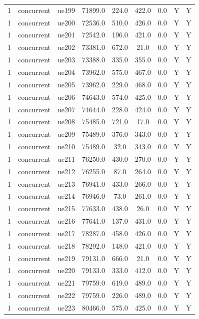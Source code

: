 \begin{table}[ht]
\begin{tabular}{|c|c|c|c|c|c|c|c|c|}
1 & concurrent & ue199 & 71899.0 & 224.0 & 422.0 & 0.0 & Y & Y \\
1 & concurrent & ue200 & 72536.0 & 510.0 & 426.0 & 0.0 & Y & Y \\
1 & concurrent & ue201 & 72542.0 & 196.0 & 421.0 & 0.0 & Y & Y \\
1 & concurrent & ue202 & 73381.0 & 672.0 & 21.0 & 0.0 & Y & Y \\
1 & concurrent & ue203 & 73388.0 & 335.0 & 355.0 & 0.0 & Y & Y \\
1 & concurrent & ue204 & 73962.0 & 575.0 & 467.0 & 0.0 & Y & Y \\
1 & concurrent & ue205 & 73962.0 & 229.0 & 468.0 & 0.0 & Y & Y \\
1 & concurrent & ue206 & 74643.0 & 574.0 & 425.0 & 0.0 & Y & Y \\
1 & concurrent & ue207 & 74644.0 & 228.0 & 424.0 & 0.0 & Y & Y \\
1 & concurrent & ue208 & 75485.0 & 721.0 & 17.0 & 0.0 & Y & Y \\
1 & concurrent & ue209 & 75489.0 & 376.0 & 343.0 & 0.0 & Y & Y \\
1 & concurrent & ue210 & 75489.0 & 32.0 & 343.0 & 0.0 & Y & Y \\
1 & concurrent & ue211 & 76250.0 & 430.0 & 270.0 & 0.0 & Y & Y \\
1 & concurrent & ue212 & 76255.0 & 87.0 & 264.0 & 0.0 & Y & Y \\
1 & concurrent & ue213 & 76941.0 & 433.0 & 266.0 & 0.0 & Y & Y \\
1 & concurrent & ue214 & 76946.0 & 73.0 & 261.0 & 0.0 & Y & Y \\
1 & concurrent & ue215 & 77633.0 & 438.0 & 26.0 & 0.0 & Y & Y \\
1 & concurrent & ue216 & 77641.0 & 137.0 & 431.0 & 0.0 & Y & Y \\
1 & concurrent & ue217 & 78287.0 & 458.0 & 426.0 & 0.0 & Y & Y \\
1 & concurrent & ue218 & 78292.0 & 148.0 & 421.0 & 0.0 & Y & Y \\
1 & concurrent & ue219 & 79131.0 & 666.0 & 21.0 & 0.0 & Y & Y \\
1 & concurrent & ue220 & 79133.0 & 333.0 & 412.0 & 0.0 & Y & Y \\
1 & concurrent & ue221 & 79759.0 & 619.0 & 489.0 & 0.0 & Y & Y \\
1 & concurrent & ue222 & 79759.0 & 226.0 & 489.0 & 0.0 & Y & Y \\
1 & concurrent & ue223 & 80466.0 & 575.0 & 425.0 & 0.0 & Y & Y \\

\end{tabular}
\end{table}
